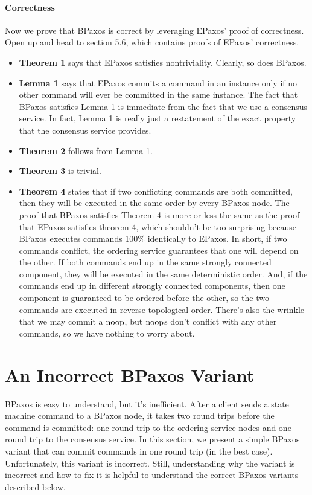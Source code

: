 \documentclass{mwhittaker}
\begin{document}
\paragraph{Correctness}
Now we prove that BPaxos is correct by leveraging EPaxos' proof of correctness.
Open up \cite{moraru2013proof} and head to section 5.6, which contains proofs
of EPaxos' correctness.
\begin{itemize}
  \item
    \textbf{Theorem 1} says that EPaxos satisfies nontriviality. Clearly, so
    does BPaxos.

  \item
    \textbf{Lemma 1} says that EPaxos commits a command in an instance only if
    no other command will ever be committed in the same instance. The fact that
    BPaxos satisfies Lemma 1 is immediate from the fact that we use a consensus
    service. In fact, Lemma 1 is really just a restatement of the exact
    property that the consensus service provides.

  \item
    \textbf{Theorem 2} follows from Lemma 1.

  \item
    \textbf{Theorem 3} is trivial.

  \item
    \textbf{Theorem 4} states that if two conflicting commands are both
    committed, then they will be executed in the same order by every BPaxos
    node. The proof that BPaxos satisfies Theorem 4 is more or less the same as
    the proof that EPaxos satisfies theorem 4, which shouldn't be too
    surprising because BPaxos executes commands 100\% identically to EPaxos. In
    short, if two commands conflict, the ordering service guarantees that one
    will depend on the other. If both commands end up in the same strongly
    connected component, they will be executed in the same deterministic order.
    And, if the commands end up in different strongly connected components,
    then one component is guaranteed to be ordered before the other, so the two
    commands are executed in reverse topological order. There's also the
    wrinkle that we may commit a $\text{noop}$, but $\text{noop}$s don't conflict with any
    other commands, so we have nothing to worry about.
\end{itemize}

\section{An Incorrect BPaxos Variant}
BPaxos is easy to understand, but it's inefficient. After a client sends a
state machine command to a BPaxos node, it takes two round trips before the
command is committed: one round trip to the ordering service nodes and one
round trip to the consensus service. In this section, we present a simple
BPaxos variant that can commit commands in one round trip (in the best case).
Unfortunately, this variant is incorrect. Still, understanding why the variant
is incorrect and how to fix it is helpful to understand the correct BPaxos
variants described below.
\end{document}
